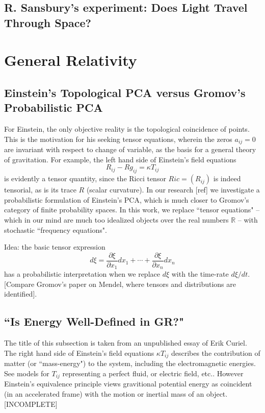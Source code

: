 \documentclass[12pt]{amsart}
\theoremstyle{remark}
\newcommand{\bR}{\mathbb{R}}
\begin{document}
\subsection{R. Sansbury's experiment: Does Light Travel Through Space?}
 
\section{General Relativity}


\subsection{Einstein's Topological PCA versus Gromov's Probabilistic PCA}
For Einstein, the only objective reality is the topological coincidence of points. This is the motivation for his seeking tensor equations, wherein the zeros $a_{ij}=0$ are invariant with respect to change of variable, as the basis for a general theory of gravitation. For example, the left hand side of Einstein's field equations $$R_{ij}-R g_{ij}=\kappa T_{ij}$$ is evidently a tensor quantity, since the Ricci tensor $Ric=(R_{ij})$ is indeed tensorial, as is its trace $R$ (scalar curvature). In our research [ref] we investigate a probabilistic formulation of Einstein's PCA, which is much closer to Gromov's category of finite probability spaces. In this work, we replace ``tensor equations" -- which in our mind are much too idealized objects over the real numbers $\bR$ --  with stochastic ``frequency equations". 

Idea: the basic tensor expression $$d\xi=\frac{\partial \xi}{\partial x_1} dx_1+\cdots + \frac{\partial \xi}{\partial x_n} dx_n$$ has a probabilistic interpretation when we replace $d\xi$ with the time-rate $d\xi/dt$. [Compare Gromov's paper on Mendel, where tensors and distributions are identified].

\subsection{``Is Energy Well-Defined in GR?"}
The title of this subsection is taken from an unpublished essay of Erik Curiel. The right hand side of Einstein's field equations $\kappa T_{ij}$ describes the contribution of matter (or ``mass-energy") to the system, including the electromagnetic energies. See models for $T_{ij}$ representing a perfect fluid, or electric field, etc.. However Einstein's equivalence principle views gravitional potential energy as coincident (in an accelerated frame) with the motion or inertial mass of an object. [INCOMPLETE]
\end{document}
